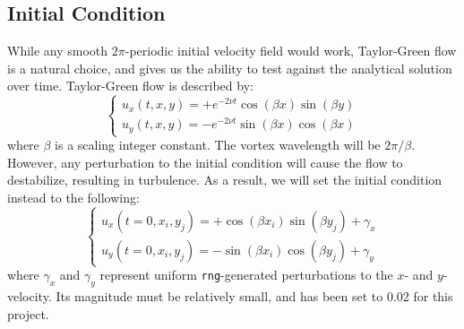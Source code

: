\documentclass[12pt, reqno]{amsart}
\begin{document}
\subsection{Initial Condition}
While any smooth $2 \pi$-periodic initial velocity field would work, Taylor-Green flow is a natural choice, and gives us the ability to test against the analytical solution over time. Taylor-Green flow is described by:
\begin{equation}
    \begin{cases}
        u_x(t, x, y) = + e^{-2 \nu t} \cos(\beta x) \sin(\beta y) \\
        u_y(t, x, y) = - e^{-2 \nu t} \sin(\beta x) \cos(\beta x)
    \end{cases}
\end{equation}
where $\beta$ is a scaling integer constant. The vortex wavelength will be $2 \pi / \beta$. However, any perturbation to the initial condition will cause the flow to destabilize, resulting in turbulence. As a result, we will set the initial condition instead to the following:
\begin{equation}
    \begin{cases}
        u_x(t = 0, x_i, y_j) = + \cos(\beta x_i) \sin(\beta y_j) + \gamma_x \\
        u_y(t = 0, x_i, y_j) = - \sin(\beta x_i) \cos(\beta y_j) + \gamma_y
    \end{cases}
\end{equation}
where $\gamma_x$ and $\gamma_y$ represent uniform \texttt{rng}-generated perturbations to the $x$- and $y$-velocity. Its magnitude must be relatively small, and has been set to 0.02 for this project.
\end{document}

